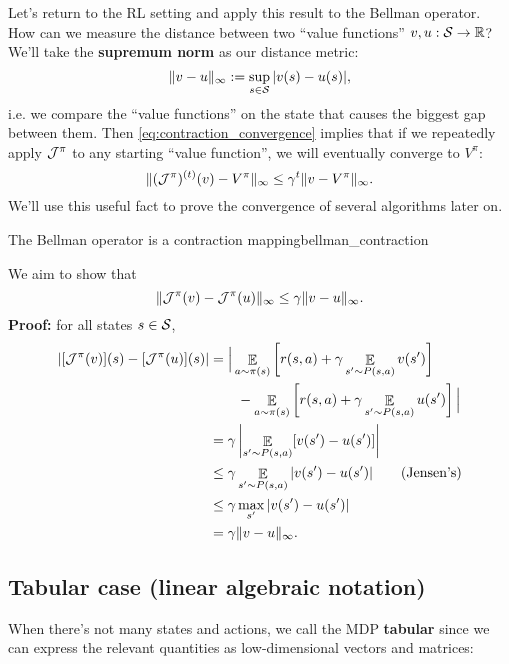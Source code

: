 \documentclass[../main/main]{subfiles}
\begin{document}
Let's return to the RL setting and apply this result to the Bellman operator. How can we measure the distance between two ``value functions'' $v, u : \S \to \R$? We'll take the \textbf{supremum norm} as our distance metric:
\[
    \| v - u \|_{\infty} := \sup_{s \in \S} |v(s) - u(s)|,
\]
i.e. we compare the ``value functions'' on the state that causes the biggest gap between them.
Then \ref{eq:contraction_convergence} implies that if we repeatedly apply $\bop^\pi$ to any starting ``value function'', we will eventually converge to $V^\pi$:
\begin{equation}
    \|(\bop^\pi)^{(t)}(v) - V^\pi \|_{\infty} \le \gamma^{t} \| v - V^\pi\|_{\infty}. \label{eq:bellman_convergence}
\end{equation}
We'll use this useful fact to prove the convergence of several algorithms later on.

\begin{theorem}{The Bellman operator is a contraction mapping}{bellman_contraction}

We aim to show that
\[
    \|\bop^{\pi} (v) - \bop^{\pi} (u) \|_{\infty} \le \gamma \|v - u \|_{\infty}.
\]
\textbf{Proof:} for all states $s \in \S$,
\begin{align*}
|[\bop^{\pi} (v)](s) - [\bop^{\pi} (u)](s)|&= \Big| \mathop{\mathbb{E}}_{a \sim \pi(s)} \left[ r(s, a) + \gamma \mathop{\mathbb{E}}_{s' \sim P(s, a)} v(s') \right] \\
&\qquad - \mathop{\mathbb{E}}_{a \sim \pi(s)} \left[r(s, a) + \gamma \mathop{\mathbb{E}}_{s' \sim P(s, a)} u(s') \right] \Big| \\
&= \gamma \left|\mathop{\mathbb{E}}_{s' \sim P(s, a)} [v(s') - u(s')] \right| \\
&\le \gamma \mathop{\mathbb{E}}_{s' \sim P(s, a)}|v(s') - u(s')| \qquad \text{(Jensen's)} \\
&\le \gamma \max_{s'} |v(s') - u(s')| \\
&= \gamma \|v - u \|_{\infty}.
\end{align*}

\end{theorem}

\subsection{Tabular case (linear algebraic notation)}

When there's not many states and actions, we call the MDP \textbf{tabular} since we can express the relevant quantities as low-dimensional vectors and matrices:
\end{document}
